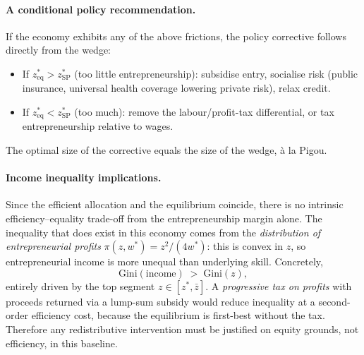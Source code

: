 \documentclass[11pt,a4paper]{article}
\begin{document}
\paragraph{A conditional policy recommendation.}
If the economy exhibits any of the above frictions, the policy corrective follows directly from the wedge:
\begin{itemize}[leftmargin=*,itemsep=1pt]
    \item If $z^{*}_{\text{eq}}>z^{*}_{\text{SP}}$ (too little entrepreneurship): subsidise entry, socialise risk (public insurance, universal health coverage lowering private risk), relax credit.
    \item If $z^{*}_{\text{eq}}<z^{*}_{\text{SP}}$ (too much): remove the labour/profit-tax differential, or tax entrepreneurship relative to wages.
\end{itemize}
The optimal size of the corrective equals the size of the wedge, à la Pigou.

\paragraph{Income inequality implications.}
Since the efficient allocation and the equilibrium coincide, there is no intrinsic efficiency--equality trade-off from the entrepreneurship margin alone. The inequality that does exist in this economy comes from the \emph{distribution of entrepreneurial profits} $\pi(z,w^{*})=z^{2}/(4w^{*})$: this is convex in $z$, so entrepreneurial income is more unequal than underlying skill. Concretely,
\[
\mathrm{Gini}(\text{income})\;>\;\mathrm{Gini}(z),
\]
entirely driven by the top segment $z\in[z^{*},\bar z]$. A \emph{progressive tax on profits} with proceeds returned via a lump-sum subsidy would reduce inequality at a second-order efficiency cost, because the equilibrium is first-best without the tax. Therefore any redistributive intervention must be justified on equity grounds, not efficiency, in this baseline.

\noindent{}
\end{document}
